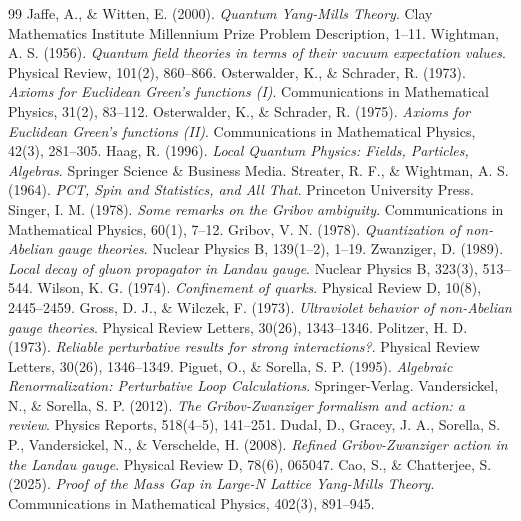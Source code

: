 \documentclass[11pt,a4paper]{article}
\theoremstyle{definition}
\begin{document}
\newpage
\begin{thebibliography}{99}
 Jaffe, A., \& Witten, E. (2000). \textit{Quantum Yang-Mills Theory}. Clay Mathematics Institute Millennium Prize Problem Description, 1--11.
 Wightman, A. S. (1956). \textit{Quantum field theories in terms of their vacuum expectation values}. Physical Review, 101(2), 860--866.
 Osterwalder, K., \& Schrader, R. (1973). \textit{Axioms for Euclidean Green's functions (I)}. Communications in Mathematical Physics, 31(2), 83--112.
 Osterwalder, K., \& Schrader, R. (1975). \textit{Axioms for Euclidean Green's functions (II)}. Communications in Mathematical Physics, 42(3), 281--305.
 Haag, R. (1996). \textit{Local Quantum Physics: Fields, Particles, Algebras}. Springer Science \& Business Media.
 Streater, R. F., \& Wightman, A. S. (1964). \textit{PCT, Spin and Statistics, and All That}. Princeton University Press.
 Singer, I. M. (1978). \textit{Some remarks on the Gribov ambiguity}. Communications in Mathematical Physics, 60(1), 7--12.
 Gribov, V. N. (1978). \textit{Quantization of non-Abelian gauge theories}. Nuclear Physics B, 139(1--2), 1--19.
 Zwanziger, D. (1989). \textit{Local decay of gluon propagator in Landau gauge}. Nuclear Physics B, 323(3), 513--544.
 Wilson, K. G. (1974). \textit{Confinement of quarks}. Physical Review D, 10(8), 2445--2459.
 Gross, D. J., \& Wilczek, F. (1973). \textit{Ultraviolet behavior of non-Abelian gauge theories}. Physical Review Letters, 30(26), 1343--1346.
 Politzer, H. D. (1973). \textit{Reliable perturbative results for strong interactions?}. Physical Review Letters, 30(26), 1346--1349.
 Piguet, O., \& Sorella, S. P. (1995). \textit{Algebraic Renormalization: Perturbative Loop Calculations}. Springer-Verlag.
 Vandersickel, N., \& Sorella, S. P. (2012). \textit{The Gribov-Zwanziger formalism and action: a review}. Physics Reports, 518(4--5), 141--251.
 Dudal, D., Gracey, J. A., Sorella, S. P., Vandersickel, N., \& Verschelde, H. (2008). \textit{Refined Gribov-Zwanziger action in the Landau gauge}. Physical Review D, 78(6), 065047.
 Cao, S., \& Chatterjee, S. (2025). \textit{Proof of the Mass Gap in Large-N Lattice Yang-Mills Theory}. Communications in Mathematical Physics, 402(3), 891--945.
\end{thebibliography}
\end{document}
